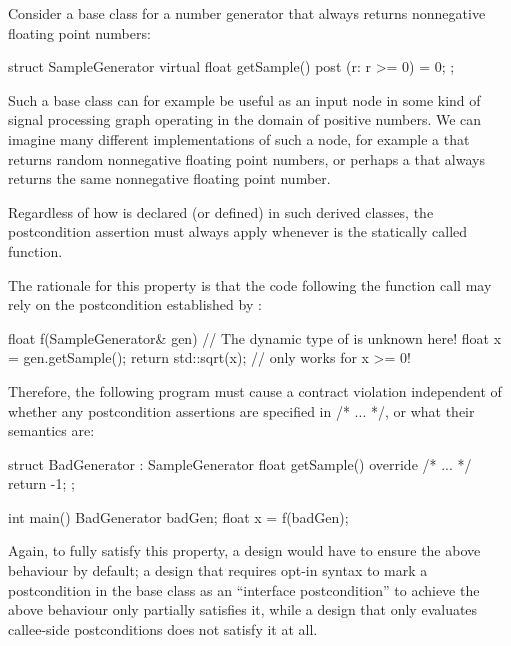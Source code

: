 Consider a base class for a number generator that always returns nonnegative floating point numbers:

\begin{codeblock}
struct SampleGenerator {
  virtual float getSample() 
     post (r: r >= 0) = 0;
};
\end{codeblock}

Such a base class can for example be useful as an input node in some kind of signal processing graph operating in the domain of positive numbers. We can imagine many different implementations of such a node, for example a \mbox{} that returns random nonnegative floating point numbers, or perhaps a \mbox{} that always returns the same nonnegative floating point number.

Regardless of how  is declared (or defined) in such derived classes, the postcondition assertion \mbox{} must always apply whenever \mbox{} is the statically called function. 

The rationale for this property is that the code following the function call may rely on the postcondition established by :

\begin{codeblock}
float f(SampleGenerator& gen) {
   // The dynamic type of  is unknown here!
   float x = gen.getSample();
   return std::sqrt(x);  // only works for x >= 0!
}
\end{codeblock}

Therefore, the following program must cause a contract violation independent of whether any postcondition assertions are specified in /* ... */, or what their semantics are:

\begin{codeblock}
struct BadGenerator : SampleGenerator {
  float getSample() override /* ... */ {
    return -1;
  }
};

int main() {
  BadGenerator badGen;
  float x = f(badGen);
}
\end{codeblock}

Again, to fully satisfy this property, a design would have to ensure the above behaviour by default; a design that requires opt-in syntax to mark a postcondition in the base class as an ``interface postcondition''  to achieve the above behaviour only partially satisfies it, while a design that only evaluates callee-side postconditions does not satisfy it at all.


